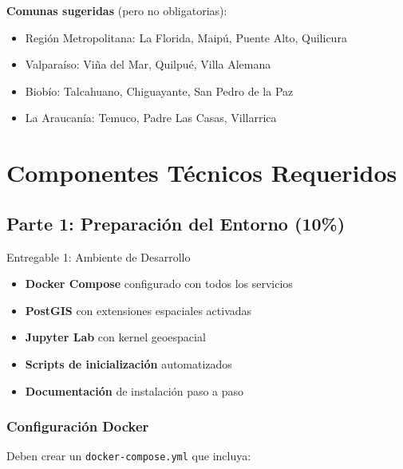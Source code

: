 \documentclass[12pt,a4paper]{article}
\begin{document}
\textbf{Comunas sugeridas} (pero no obligatorias):
\begin{itemize}
    \item Región Metropolitana: La Florida, Maipú, Puente Alto, Quilicura
    \item Valparaíso: Viña del Mar, Quilpué, Villa Alemana
    \item Biobío: Talcahuano, Chiguayante, San Pedro de la Paz
    \item La Araucanía: Temuco, Padre Las Casas, Villarrica
\end{itemize}

\section{Componentes Técnicos Requeridos}

\subsection{Parte 1: Preparación del Entorno (10\%)}

\begin{deliverable}{Entregable 1: Ambiente de Desarrollo}
\begin{itemize}
    \item \textbf{Docker Compose} configurado con todos los servicios
    \item \textbf{PostGIS} con extensiones espaciales activadas
    \item \textbf{Jupyter Lab} con kernel geoespacial
    \item \textbf{Scripts de inicialización} automatizados
    \item \textbf{Documentación} de instalación paso a paso
\end{itemize}
\end{deliverable}

\subsubsection{Configuración Docker}

Deben crear un \texttt{docker-compose.yml} que incluya:
\end{document}
